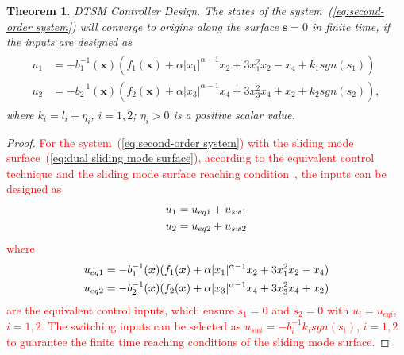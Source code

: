 \documentclass[3p]{elsarticle}
\theoremstyle{plain}
\newtheorem{mythm}{Theorem}
\theoremstyle{remark}
\begin{document}
\begin{mythm}\label{theorem:1}DTSM Controller Design. The states of the system~(\ref{eq:second-order system}) will converge to origins along the surface $\bm s=0$ in finite time, if the inputs are designed as
\begin{align}
\begin{split}
u_1 &= -b_1^{-1}(\bm x)(f_1(\bm x)+\alpha\vert x_1\vert^{\alpha-1}x_2+3x_1^2x_2-x_4+k_1sgn(s_1))\\
u_2 &= -b_2^{-1}(\bm x)(f_2(\bm x)+\alpha\vert x_3\vert^{\alpha-1}x_4+3x_3^2x_4+x_2+k_2sgn(s_2)),\label{eq:DSM input}
\end{split}
\end{align}
where $k_i = l_i+\eta_i$, $i=1,2$; $\eta_i>0$ is a positive scalar value.
\end{mythm}
\begin{proof}
\textcolor{red}{For the system~(\ref{eq:second-order system}) with the sliding mode  surface~(\ref{eq:dual sliding mode  surface}), according to the equivalent control technique and the sliding mode  surface reaching condition~\cite{Arie1993sliding}, the inputs can be designed as
\begin{align}\begin{split}
u_1 &= u_{eq1}+u_{sw1}\\
u_2 &= u_{eq2}+u_{sw2}\notag
\end{split}\end{align}
where
\begin{align}\begin{split}
u_{eq1} &= -b_1^{-1}(\bm x)(f_1(\bm x)+\alpha\vert x_1\vert^{\alpha-1}x_2+3x_1^2x_2-x_4)\\
u_{eq2} &= -b_2^{-1}(\bm x)(f_2(\bm x)+\alpha\vert x_3\vert^{\alpha-1}x_4+3x_3^2x_4+x_2)\notag
\end{split}\end{align}
are the equivalent control inputs, which ensure $\dot s_1 = 0$ and $\dot s_2=0$ with $u_i = u_{eqi}$, $i=1,2$. The switching inputs can be selected as $u_{swi}=-b_i^{-1}k_isgn(s_i)$, $i=1,2$ to guarantee the finite time reaching conditions of the sliding mode  surface.}


\end{proof}
\end{document}
